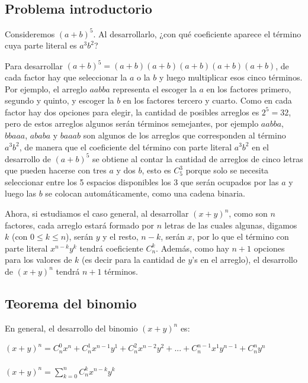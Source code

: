 \subsection{Problema introductorio}

Consideremos $(a+b)^5$. Al desarrollarlo, ¿con qué coeficiente aparece el término cuya parte literal es $a^3b^2$?

Para desarrollar $(a+b)^5= (a+b)(a+b)(a+b)(a+b)(a+b)$, de cada factor hay que seleccionar la $a$ o la $b$ y luego multiplicar esos cinco términos. Por ejemplo, el arreglo $aabba$ representa el escoger la $a$ en los factores primero, segundo y quinto, y escoger la $b$ en los factores tercero y cuarto. Como en cada factor hay dos opciones para elegir, la cantidad de posibles arreglos es $2^5= 32$, pero de estos arreglos algunos serán términos semejantes, por ejemplo $aabba$, $bbaaa$, $ababa$ y $baaab$ son algunos de los arreglos que corresponden al término $a^3b^2$, de manera que el coeficiente del término con parte literal $a^3b^2$ en el desarrollo de $(a+b)^5$ se obtiene al contar la cantidad de arreglos de cinco letras que pueden hacerse con tres $a$ y dos $b$, esto es $C^{3}_{5}$ porque solo se necesita seleccionar entre los 5 espacios disponibles los 3 que serán ocupados por las $a$ y luego las $b$ se colocan automáticamente, como una cadena binaria.

Ahora, si estudiamos el caso general, al desarrollar $(x+y)^n$, como son $n$ factores, cada arreglo estará formado por $n$ letras de las cuales algunas, digamos $k$ (con $0 \leq k \leq n$), serán $y$ y el resto, $n-k$, serán $x$, por lo que el término con parte literal $x^{n-k} y^k$ tendrá coeficiente $C^{k}_{n}$. Además, como hay $n+1$ opciones para los valores de $k$ (es decir para la cantidad de $y$’s en el arreglo), el desarrollo de $(x+y)^n$ tendrá $n+1$ términos. 

\subsection{Teorema del binomio}

En general, el desarrollo del binomio $(x+y)^n$ es:

\begin{center}
    $(x+y)^n= C^{0}_{n} x^{n} + C^{1}_{n} x^{n-1} y^{1} + C^{2}_{n} x^{n-2} y^{2} + ... + C^{n-1}_{n} x^{1} y^{n-1} + C^{n}_{n} y^{n}$ \\ \hfill \\
    $(x+y)^n= \displaystyle\sum_{k=0}^{n} C^{k}_{n} x^{n-k} y^{k}$
\end{center}

